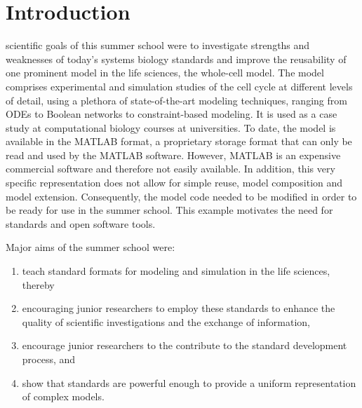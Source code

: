 \documentclass[journal,transmag]{IEEEtran}
\begin{document}
\section{Introduction}
% 
% 
% 
% 
 scientific goals of this summer school were to investigate strengths and weaknesses of today’s systems biology standards and improve the reusability of one prominent model in the
life sciences, the whole-cell model. 
The model comprises experimental and simulation studies of the cell cycle at different levels of detail, using a plethora of state-of-the-art modeling techniques, ranging from ODEs to Boolean networks to constraint-based modeling. 
It is used as a case study at computational biology courses at universities. 
To date, the model is available in the MATLAB format, a proprietary storage format that can only be read and used by the MATLAB software. 
However, MATLAB is an expensive commercial software and therefore not easily available. 
In addition, this very specific representation does not allow for simple reuse, model composition and model extension. 
Consequently, the model code needed to be modified in order to be ready for use in the summer school. This example motivates the need for standards and open software tools.

Major aims of the summer school were:
\begin{enumerate}
\item teach standard formats for modeling and simulation in the life sciences, thereby
\item encouraging junior researchers to employ these standards to enhance the quality of
scientific investigations and the exchange of information,
\item encourage junior researchers to the contribute to the standard development
process, and
\item show that standards are powerful enough to provide a uniform representation of
complex models.
\end{enumerate}
\end{document}
